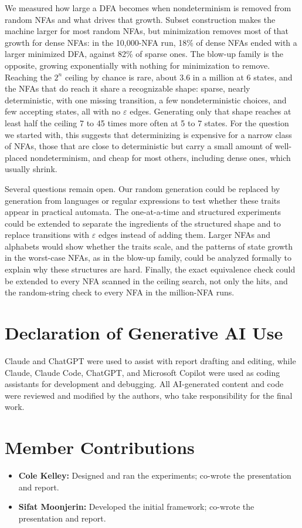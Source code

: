 \documentclass[9pt]{ieeeconf}
\begin{document}
We measured how large a DFA becomes when nondeterminism is removed from random NFAs and what drives that growth. Subset construction makes the machine larger for most random NFAs, but minimization removes most of that growth for dense NFAs: in the 10,000-NFA run, 18\% of dense NFAs ended with a larger minimized DFA, against 82\% of sparse ones. The blow-up family is the opposite, growing exponentially with nothing for minimization to remove. Reaching the $2^n$ ceiling by chance is rare, about 3.6 in a million at 6 states, and the NFAs that do reach it share a recognizable shape: sparse, nearly deterministic, with one missing transition, a few nondeterministic choices, and few accepting states, all with no $\varepsilon$ edges. Generating only that shape reaches at least half the ceiling 7 to 45 times more often at 5 to 7 states. For the question we started with, this suggests that determinizing is expensive for a narrow class of NFAs, those that are close to deterministic but carry a small amount of well-placed nondeterminism, and cheap for most others, including dense ones, which usually shrink.

Several questions remain open. Our random generation could be replaced by generation from languages or regular expressions to test whether these traits appear in practical automata. The one-at-a-time and structured experiments could be extended to separate the ingredients of the structured shape and to replace transitions with $\varepsilon$ edges instead of adding them. Larger NFAs and alphabets would show whether the traits scale, and the patterns of state growth in the worst-case NFAs, as in the blow-up family, could be analyzed formally to explain why these structures are hard. Finally, the exact equivalence check could be extended to every NFA scanned in the ceiling search, not only the hits, and the random-string check to every NFA in the million-NFA runs.

\section{Declaration of Generative AI Use}
\label{sec:genai}

Claude and ChatGPT were used to assist with report drafting and editing, while Claude, Claude Code, ChatGPT, and Microsoft Copilot were used as coding assistants for development and debugging. All AI-generated content and code were reviewed and modified by the authors, who take responsibility for the final work.

\section*{Member Contributions}
\label{sec:contributions}

\begin{itemize}
    \item \textbf{Cole Kelley:} Designed and ran the experiments; co-wrote the presentation and report.
    \item \textbf{Sifat Moonjerin:} Developed the initial framework; co-wrote the presentation and report.
\end{itemize}



\end{document}
